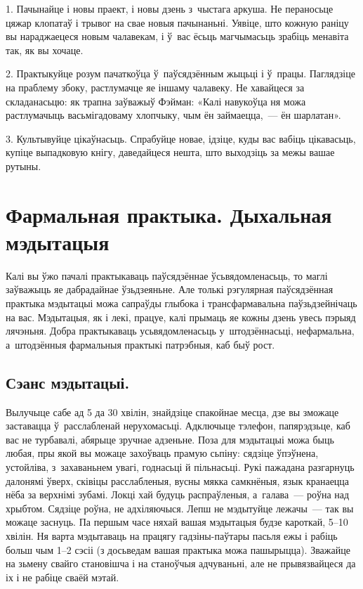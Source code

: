 1. Пачынайце і новы праект, і новы дзень з~чыстага аркуша. Не пераносьце цяжар клопатаў і трывог на свае новыя пачынаньні. Уявіце, што кожную раніцу вы нараджаецеся новым чалавекам, і ў~вас ёсьць магчымасьць зрабіць менавіта так, як вы хочаце.

2. Практыкуйце розум пачаткоўца ў~паўсядзённым жыцьці і ў~працы. Паглядзіце на праблему збоку, растлумачце яе іншаму чалавеку. Не хавайцеся за складанасьцю: як трапна заўважыў Фэйман: «Калі навукоўца ня можа растлумачыць васьмігадоваму хлопчыку, чым ён займаецца,~--- ён шарлатан».

3. Культывуйце цікаўнасьць. Спрабуйце новае, ідзіце, куды вас вабіць цікавасьць, купіце выпадковую кнігу, даведайцеся нешта, што выходзіць за межы вашае рутыны.


\section{Фармальная практыка. Дыхальная мэдытацыя}

Калі вы ўжо пачалі практыкаваць паўсядзённае ўсьвядомленасьць, то маглі заўважыць яе дабрадайнае ўзьдзеяньне. Але толькі рэгулярная паўсядзённая практыка мэдытацыі можа сапраўды глыбока і трансфармавальна паўзьдзейнічаць на вас. Мэдытацыя, як і лекі, працуе, калі прымаць яе кожны дзень увесь пэрыяд лячэньня. Добра практыкаваць усьвядомленасьць у~штодзённасьці, нефармальна, а~штодзённыя фармальныя практыкі патрэбныя, каб быў рост. 


\subsection*{Сэанс мэдытацыі.}

Вылучыце сабе ад 5 да 30 хвілін, знайдзіце спакойнае месца, дзе вы зможаце заставацца ў~расслабленай нерухомасьці. Адключыце тэлефон, папярэдзьце, каб вас не турбавалі, абярыце зручнае адзеньне. Поза для мэдытацыі можа быць любая, пры якой вы можаце захоўваць прамую сьпіну: сядзіце ўпэўнена, устойліва, з~захаваньнем увагі, годнасьці й пільнасьці. Рукі пажадана разгарнуць далонямі ўверх, сківіцы расслабленыя, вусны мякка самкнёныя, язык кранаецца нёба за верхнімі зубамі. Локці хай будуць распраўленыя, а~галава~--- роўна над хрыбтом. Сядзіце роўна, не адхіляючыся. Лепш не мэдытуйце лежачы~--- так вы можаце заснуць. Па першым часе няхай вашая мэдытацыя будзе кароткай, 5--10 хвілін. Ня варта мэдытаваць на працягу гадзіны-паўтары пасьля ежы і рабіць больш чым 1--2 сэсіі (з досьведам вашая практыка можа пашырыцца). Зважайце на зьмену свайго становішча і на станоўчыя адчуваньні, але не прывязвайцеся да іх і не рабіце сваёй мэтай. 

